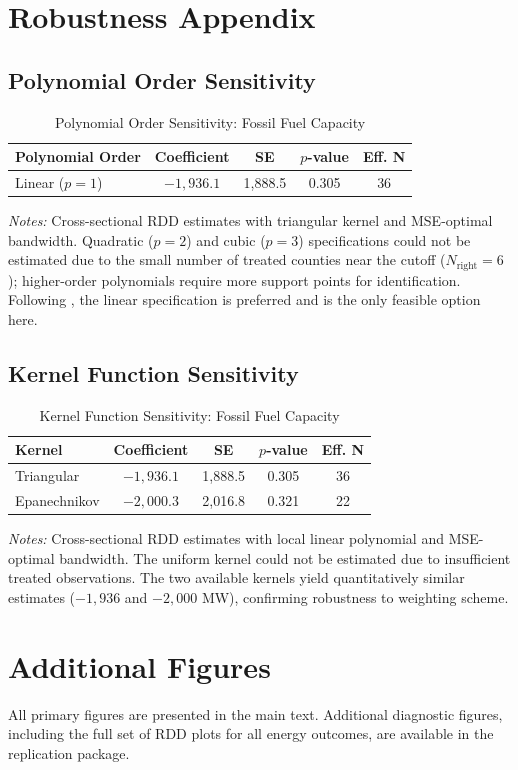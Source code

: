 \documentclass[12pt]{article}
\begin{document}
\section{Robustness Appendix}
\label{app:robustness}

\subsection{Polynomial Order Sensitivity}

\begin{table}[H]
\centering
\caption{Polynomial Order Sensitivity: Fossil Fuel Capacity}
\begin{tabular}{lcccc}
\toprule
Polynomial Order & Coefficient & SE & $p$-value & Eff. N \\
\midrule
Linear ($p=1$) & $-1{,}936.1$ & 1,888.5 & 0.305 & 36 \\
\bottomrule
\end{tabular}
\begin{tablenotes}
\small
\item \textit{Notes:} Cross-sectional RDD estimates with triangular kernel and MSE-optimal bandwidth. Quadratic ($p=2$) and cubic ($p=3$) specifications could not be estimated due to the small number of treated counties near the cutoff ($N_{\text{right}} = 6$); higher-order polynomials require more support points for identification. Following \citet{gelman2019high}, the linear specification is preferred and is the only feasible option here.
\end{tablenotes}
\end{table}

\subsection{Kernel Function Sensitivity}

\begin{table}[H]
\centering
\caption{Kernel Function Sensitivity: Fossil Fuel Capacity}
\begin{tabular}{lcccc}
\toprule
Kernel & Coefficient & SE & $p$-value & Eff. N \\
\midrule
Triangular & $-1{,}936.1$ & 1,888.5 & 0.305 & 36 \\
Epanechnikov & $-2{,}000.3$ & 2,016.8 & 0.321 & 22 \\
\bottomrule
\end{tabular}
\begin{tablenotes}
\small
\item \textit{Notes:} Cross-sectional RDD estimates with local linear polynomial and MSE-optimal bandwidth. The uniform kernel could not be estimated due to insufficient treated observations. The two available kernels yield quantitatively similar estimates ($-1{,}936$ and $-2{,}000$ MW), confirming robustness to weighting scheme.
\end{tablenotes}
\end{table}


\section{Additional Figures}
\label{app:figures}

All primary figures are presented in the main text. Additional diagnostic figures, including the full set of RDD plots for all energy outcomes, are available in the replication package.
\end{document}
